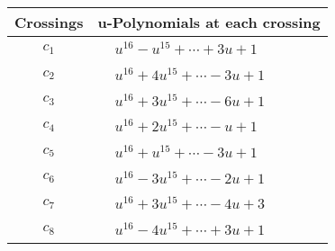 \documentclass[1p]{elsarticle_modified}
\theoremstyle{definition}
\begin{document}
\begin{tabular}{m{50pt}|m{274pt}}
Crossings & \hspace{64pt}u-Polynomials at each crossing \\
\hline $$\begin{aligned}c_{1}\end{aligned}$$&$\begin{aligned}
&u^{16}- u^{15}+\cdots+3 u+1
\end{aligned}$\\
\hline $$\begin{aligned}c_{2}\end{aligned}$$&$\begin{aligned}
&u^{16}+4 u^{15}+\cdots-3 u+1
\end{aligned}$\\
\hline $$\begin{aligned}c_{3}\end{aligned}$$&$\begin{aligned}
&u^{16}+3 u^{15}+\cdots-6 u+1
\end{aligned}$\\
\hline $$\begin{aligned}c_{4}\end{aligned}$$&$\begin{aligned}
&u^{16}+2 u^{15}+\cdots- u+1
\end{aligned}$\\
\hline $$\begin{aligned}c_{5}\end{aligned}$$&$\begin{aligned}
&u^{16}+u^{15}+\cdots-3 u+1
\end{aligned}$\\
\hline $$\begin{aligned}c_{6}\end{aligned}$$&$\begin{aligned}
&u^{16}-3 u^{15}+\cdots-2 u+1
\end{aligned}$\\
\hline $$\begin{aligned}c_{7}\end{aligned}$$&$\begin{aligned}
&u^{16}+3 u^{15}+\cdots-4 u+3
\end{aligned}$\\
\hline $$\begin{aligned}c_{8}\end{aligned}$$&$\begin{aligned}
&u^{16}-4 u^{15}+\cdots+3 u+1
\end{aligned}$\\

\end{tabular}
\end{document}
